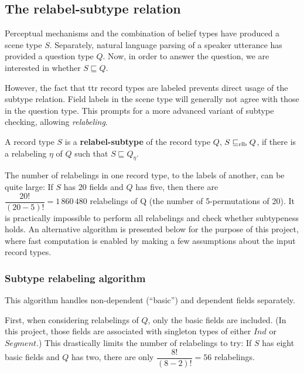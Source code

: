 \subsection{The relabel-subtype relation}
\label{sec:subtyperelabeling}

Perceptual mechanisms and the combination of belief types have produced a scene type $S$.
Separately, natural language parsing of a speaker utterance has provided a question type $Q$.
Now, in order to answer the question, we are interested in whether $S \sqsubseteq Q$.

However, the fact that \gls{ttr} record types are labeled prevents direct usage of the subtype relation.
Field labels in the scene type will generally not agree with those in the question type.
This prompts for a more advanced variant of subtype checking, allowing \textit{relabeling}.


\begin{definition}
A record type $S$ is a \textbf{relabel-subtype} of the record type $Q$, $S \mathrel{\sqsubseteq_\text{rlb}} Q$, if there is a relabeling $\eta$ of $Q$ such that $S \sqsubseteq Q_\eta$.

\end{definition}

The number of relabelings in one record type, to the labels of another, can be quite large:
If $S$ has 20 fields and $Q$ has five, then there are $\dfrac{20!}{(20-5)!} = 1\,860\,480$ relabelings of Q (the number of 5-permutations of 20).
It is practically impossible to perform all relabelings and check whether subtypeness holds.
An alternative algorithm is presented below for the purpose of this project, where fast computation is enabled by making a few assumptions about the input record types.



\subsubsection{Subtype relabeling algorithm}

This algorithm handles non-dependent (``basic'') and dependent fields separately.

First, when considering relabelings of $Q$, only the basic fields are included.
(In this project, those fields are associated with singleton types of either $Ind$ or $Segment$.)
This drastically limits the number of relabelings to try:
If $S$ has eight basic fields and $Q$ has two, there are only $\dfrac{8!}{(8-2)!} = 56$ relabelings.

